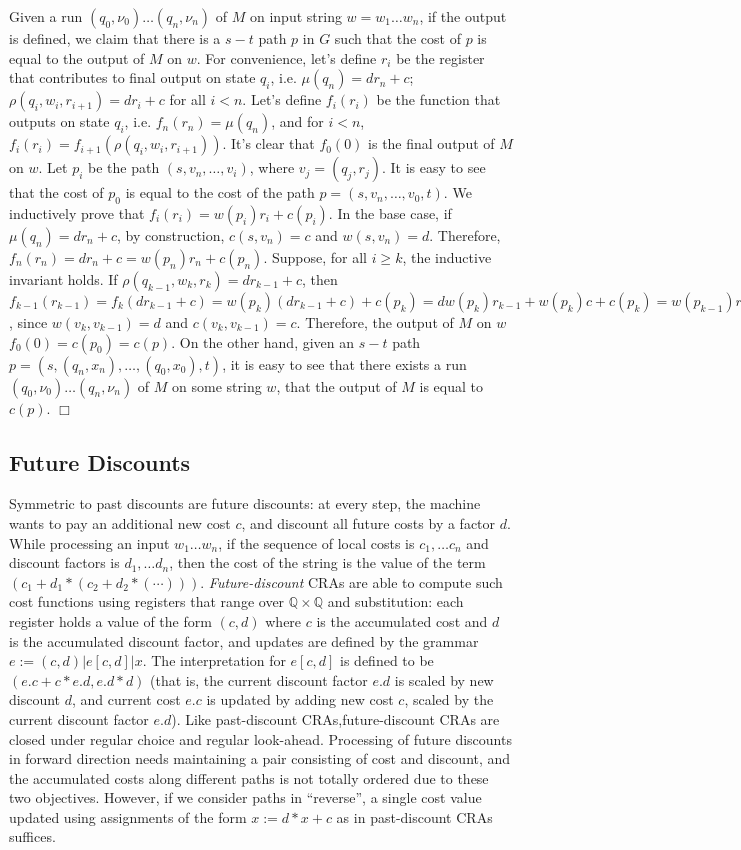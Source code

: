 \documentclass[11pt]{article}
\def\qed{{\bf $\Box$}}
\newcommand{\mypar}[1]{\subsection{#1}}
\def\qed{{\bf $\Box$}}
\newcommand{\Rat}{\ensuremath{\mathbb{Q}}}
\newcommand{\state}{\ensuremath{q}}
\newcommand{\valuation}{\ensuremath{\nu}}
\newcommand{\edwa}{\ensuremath{M}}
\newcommand{\edwastate}{\ensuremath{q}}
\newcommand{\edwavarup}{\ensuremath{\rho}}
\newcommand{\edwafinal}{\ensuremath{\mu}}
\begin{document}
Given a run $(\edwastate_0,\valuation_0)\ldots
(\edwastate_n,\valuation_n)$ of $\edwa$ on input string $w=w_1\ldots w_n$, if the output is defined,
we claim that there is a $s-t$ path $p$ in $G$ such that the cost of $p$ is equal to the output of $\edwa$ on $w$.
For convenience, let's define $r_i$ be the register that contributes to final output on state $\state_i$,
i.e. $\edwafinal(\state_n)=dr_n+c$; $\edwavarup(\state_i,w_i,r_{i+1})=dr_i+c$ for all $i<n$.
Let's define $f_i(r_i)$ be the function that outputs on state $\state_i$, i.e. $f_n(r_n)=\edwafinal(\state_n)$,
and for $i<n$, $f_i(r_i)=f_{i+1}(\edwavarup(\state_i,w_i,r_{i+1}))$.
It's clear that $f_0(0)$ is the final output of $\edwa$ on $w$.
Let $p_i$ be the path $(s,v_n,\ldots,v_i)$, where $v_j=(\state_j,r_j)$. It is easy to see that the cost of $p_0$
is equal to the cost of the path $p=(s,v_n,\ldots,v_0,t)$.
We inductively prove that $f_i(r_i)=w(p_i)r_i+c(p_i)$.
In the base case, if $\edwafinal(\edwastate_n)=dr_n+c$, by construction, $c(s,v_n)=c$ and $w(s,v_n)=d$.
Therefore, $f_n(r_n)=dr_n+c=w(p_n)r_n+c(p_n)$.
Suppose, for all $i\ge k$, the inductive invariant holds.
If $\edwavarup(\state_{k-1},w_k,r_k)=dr_{k-1}+c$, then
$f_{k-1}(r_{k-1})=f_k(dr_{k-1}+c)=w(p_k)(dr_{k-1}+c)+c(p_k)=dw(p_{k})r_{k-1}+w(p_k)c+c(p_k)=w(p_{k-1})r_{k-1}+c(p_{k-1})$, since $w(v_k,v_{k-1})=d$ and $c(v_k,v_{k-1})=c$.
Therefore, the output of $\edwa$ on $w$ $f_0(0)=c(p_0)=c(p)$.
On the other hand, given an $s-t$ path $p=(s,(\state_n,x_n),\ldots,(\state_0,x_0),t)$,  it is easy to see that there exists a run  $(\edwastate_0,\valuation_0)\ldots
(\edwastate_n,\valuation_n)$ of $\edwa$ on some string $w$, that the output of $\edwa$ is equal to $c(p)$.
\qed

\mypar{Future Discounts} Symmetric to past discounts are future
discounts: at every step, the machine wants to pay an additional new
cost $c$, and discount all future costs by a factor $d$. While
processing an input $w_1\ldots w_n$, if the sequence of local costs
is $c_1,\ldots c_n$ and discount factors is $d_1,\ldots d_n$, then
the cost of the string is the value of the term $(c_1 + d_1*(c_2 +
d_2*(\cdots )))$. {\em Future-discount} CRAs are able to compute
such cost functions using registers that range over $\Rat\times\Rat$
and substitution: each register holds a value of the form $(c,d)$
where $c$ is the accumulated cost and $d$ is the accumulated
discount factor, and updates are defined by the grammar $
e:=(c,d)|e[c,d]|x$. The interpretation for $e[c,d]$ is defined to be
$(e.c+c*e.d,e.d*d)$ (that is, the current discount factor $e.d$ is
scaled by new discount $d$, and current cost $e.c$ is updated by
adding new cost $c$, scaled by the current discount factor $e.d$).
Like past-discount CRAs,future-discount CRAs are closed under
regular choice and regular look-ahead. Processing of future
discounts in forward direction needs maintaining a pair consisting
of cost and discount, and the accumulated costs along different
paths is not totally ordered due to these two objectives. However,
if we consider paths in ``reverse'', a single cost value updated
using assignments of the form $x:=d*x + c$ as in past-discount CRAs
suffices.
\end{document}
